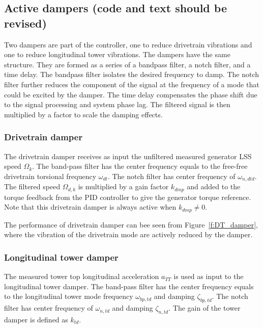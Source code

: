 \subsection{Active dampers (code and text should be revised)}

Two dampers are part of the controller, one to reduce drivetrain vibrations and one to reduce longitudinal tower vibrations. The dampers have the same structure. They are formed as a series of a bandpass filter, a notch filter, and a time delay. The bandpass filter isolates the desired frequency to damp. The notch filter further reduces the component of the signal at the frequency of a mode that could be excited by the damper. The time delay compensates the phase shift due to the signal processing and system phase lag.
The filtered signal is then multiplied by a factor to scale the damping effects.

\subsubsection{Drivetrain damper}
\label{s:dmp}

The drivetrain damper receives as input the unfiltered measured generator LSS speed $\Omega_k$. The band-pass filter has the center frequency equals to the free-free drivetrain torsional frequency $\omega_{dt}$. The notch filter has center frequency of $\omega_{n,dtd}$. The filtered speed $\Omega_{d,k}$ is multiplied by a gain factor $k_{dmp}$ and added to the torque feedback from the PID controller to give the generator torque reference. Note that this drivetrain damper is always active when $k_{dmp}\ne0$. 

The performance of drivetrain damper can bee seen from Figure~\ref{f:DT_damper}, where the vibration of the drivetrain mode are actively reduced by the damper.

\subsubsection{Longitudinal tower damper}
\label{s:TTdmp}


The measured tower top longitudinal acceleration $a_{TT}$ is used as input to the longitudinal tower damper. The band-pass filter has the center frequency equals to the longitudinal tower mode frequency $\omega_{bp,td}$ and damping $\zeta_{bp,td}$. The notch filter has center frequency of  $\omega_{n,td}$ and damping $\zeta_{n,td}$. The gain of the tower damper is defined as $k_{td}$. 

